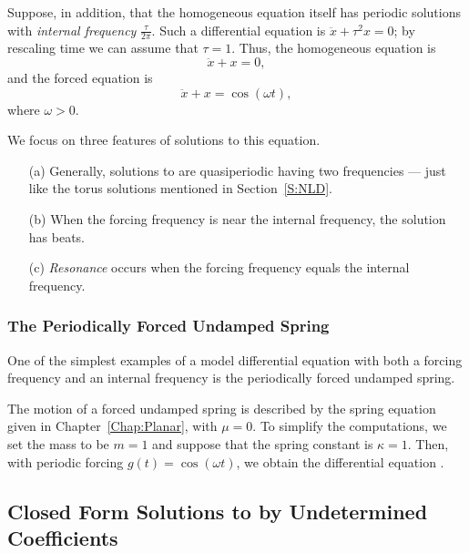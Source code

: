 Suppose, in addition, that the homogeneous equation itself has periodic 
solutions with 
{\em internal frequency\/} 
$\frac{\tau}{2\pi}$.  Such a 
differential equation is $\ddot{x}+\tau^2x=0$; by rescaling time we 
can assume that $\tau=1$.   Thus, the homogeneous equation is 
\[
\ddot x + x = 0,
\]
and the forced equation is
\begin{equation} \label{eq:uspf}
\ddot x + x = \cos(\omega t),
\end{equation}
where $\omega>0$.

We focus on three features of solutions to this equation.
\begin{itemize}
\item[(a)]	Generally, solutions to  are quasiperiodic 
having two frequencies --- just like the torus 
solutions mentioned in Section~\ref{S:NLD}.
\item[(b)]	When the forcing frequency is near the internal frequency, the
solution has beats.
\item[(c)] 	{\em Resonance\/} occurs when the 
forcing frequency equals the internal frequency.  
\end{itemize}

\subsubsection*{The Periodically Forced Undamped Spring}

One of the simplest examples of a model differential equation with both a
forcing frequency and an internal frequency is the periodically forced 
 undamped spring.

The motion of a forced undamped spring is described by the spring equation 
given in Chapter~\ref{Chap:Planar},  with $\mu = 0$.
To simplify the computations, we set the mass to be $m=1$ and suppose that 
the spring constant is $\kappa=1$.  Then, with periodic forcing 
$g(t)=\cos(\omega t)$, we obtain the differential equation .

\subsection*{Closed Form Solutions to  by Undetermined 
Coefficients}

